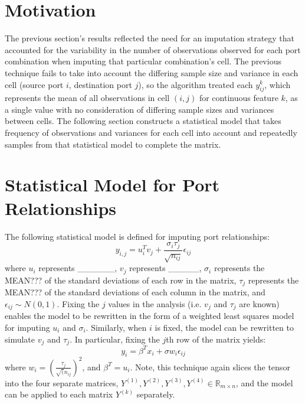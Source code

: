 \documentclass[12pt,twoside]{dukestatscithesis}
\theoremstyle{definition}
\theoremstyle{definition}
\theoremstyle{definition}
\theoremstyle{remark}
\begin{document}
\section{Motivation}\label{motivation-2}

The previous section's results reflected the need for an imputation
strategy that accounted for the variability in the number of
observations observed for each port combination when imputing that
particular combination's cell. The previous technique fails to take into
account the differing sample size and variance in each cell (source port
\(i\), destination port \(j\)), so the algorithm treated each
\(y_{ij}^{k}\), which represents the mean of all observations in cell
\((i,j)\) for continuous feature \(k\), as a single value with no
consideration of differing sample sizes and variances between cells. The
following section constructs a statistical model that takes frequency of
observations and variances for each cell into account and repeatedly
samples from that statistical model to complete the matrix.

\section{Statistical Model for Port
Relationships}\label{statistical-model-for-port-relationships}

The following statistical model is defined for imputing port
relationships:
\[y_{i,j} = u_i^Tv_j + \frac{\sigma_i \tau_j}{\sqrt{n_{ij}}}\epsilon_{ij}\]
where \(u_i\) represents \_\_\_\_\_\_, \(v_j\) represents \_\_\_\_\_,
\(\sigma_i\) represents the MEAN??? of the standard deviations of each
row in the matrix, \(\tau_j\) represents the MEAN??? of the standard
deviations of each column in the matrix, and
\(\epsilon_{ij} \sim N(0,1)\). Fixing the \(j\) values in the analysis
(i.e. \(v_j\) and \(\tau_j\) are known) enables the model to be
rewritten in the form of a weighted least squares model for imputing
\(u_i\) and \(\sigma_i\). Similarly, when \(i\) is fixed, the model can
be rewritten to simulate \(v_j\) and \(\tau_j\). In particular, fixing
the \(j\)th row of the matrix yields:
\[y_i = \beta^Tx_i + \sigma w_i\epsilon_{ij}\] where
\(w_i = (\frac{\tau_j}{\sqrt(n_{ij}})^2\), and \(\beta^T = u_i\). Note,
this technique again slices the tensor into the four separate matrices,
\(Y^{(1)}, Y^{(2)}, Y^{(3)}, Y^{(4)} \in \mathbb{R}_{m \times n}\), and
the model can be applied to each matrix \(Y^{(k)}\) separately.
\end{document}
